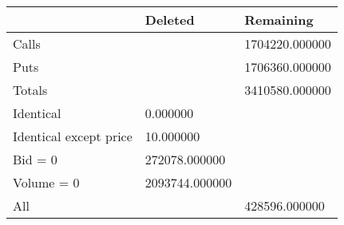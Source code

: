 \begin{tabular}{lll}
\toprule
 & Deleted & Remaining \\
\midrule
Calls &  & 1704220.000000 \\
Puts &  & 1706360.000000 \\
Totals &  & 3410580.000000 \\
Identical & 0.000000 &  \\
Identical except price & 10.000000 &  \\
Bid = 0 & 272078.000000 &  \\
Volume = 0 & 2093744.000000 &  \\
All &  & 428596.000000 \\
\bottomrule
\end{tabular}
